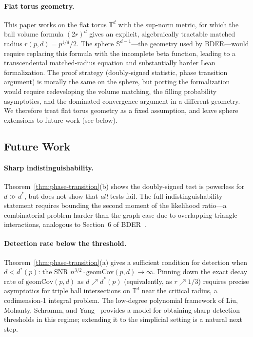 \documentclass[reqno,12pt]{amsart}
\newcommand{\geomCov}{\mathrm{geomCov}}
\newcommand{\TT}{\mathbb{T}}         %
\newcommand{\Sph}{\mathbb{S}}
\theoremstyle{plain}
\theoremstyle{definition}
\theoremstyle{remark}
\begin{document}
\paragraph{Flat torus geometry.}
This paper works on the flat torus $\TT^d$ with the sup-norm metric, for which the ball
volume formula $(2r)^d$ gives an explicit, algebraically tractable matched radius
$r(p,d) = p^{1/d}/2$. The sphere $\Sph^{d-1}$---the geometry used by BDER---would require
replacing this formula with the incomplete beta function, leading to a transcendental
matched-radius equation and substantially harder Lean formalization. The proof strategy
(doubly-signed statistic, phase transition argument) is morally the same on the sphere, but
porting the formalization would require redeveloping the volume matching, the filling
probability asymptotics, and the dominated convergence argument in a different geometry.
We therefore treat flat torus geometry as a fixed assumption, and leave sphere extensions
to future work (see below).

\subsection{Future Work}

\paragraph{Sharp indistinguishability.}
Theorem~\ref{thm:phase-transition}(b) shows the doubly-signed test is powerless for
$d\gg d^*$, but does not show that \emph{all} tests fail. The full indistinguishability
statement requires bounding the second moment of the likelihood ratio---a combinatorial
problem harder than the graph case due to overlapping-triangle interactions, analogous to
Section~6 of BDER~\cite{Bubeck2016}.

\paragraph{Detection rate below the threshold.}
Theorem~\ref{thm:phase-transition}(a) gives a sufficient condition for detection when
$d < d^*(p)$: the SNR $n^{3/2}\cdot\geomCov(p,d)\to\infty$. Pinning down the exact
decay rate of $\geomCov(p,d)$ as $d\nearrow d^*(p)$ (equivalently, as $r\nearrow 1/3$)
requires precise asymptotics for triple ball intersections on $\TT^d$ near the critical
radius, a codimension-1 integral problem. The low-degree polynomial framework of Liu,
Mohanty, Schramm, and Yang~\cite{Liu2022} provides a model for obtaining sharp detection
thresholds in this regime; extending it to the simplicial setting is a natural next step.
\end{document}
